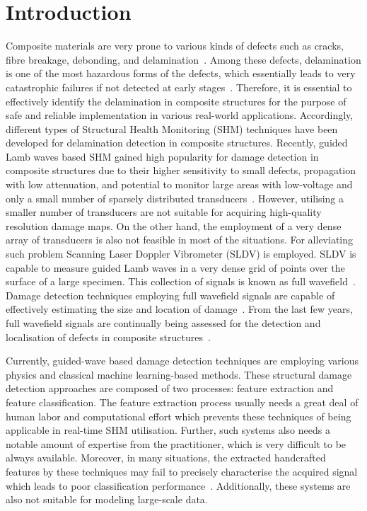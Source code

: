 \section{Introduction}
Composite materials are very prone to various kinds of defects such as cracks, fibre breakage, debonding, and delamination~\cite{ip2004delamination, smith2009composite}. 
Among these defects, delamination is one of the most hazardous forms of the defects, which essentially leads to very catastrophic failures if not detected at early stages~\cite{valdes1999delamination}. 
Therefore, it is essential to effectively identify the delamination in composite structures for the purpose of safe and reliable implementation in various real-world applications. 
Accordingly, different types of Structural Health Monitoring (SHM) techniques have been developed for delamination detection in composite structures. 
Recently, guided Lamb waves based SHM gained high popularity for damage detection in composite structures due to their higher sensitivity to small defects, propagation with low attenuation, and potential to monitor large areas with low-voltage and only a small number of sparsely distributed transducers~\cite{alleyne1992interaction, giurgiutiu2003lamb, ihn2008pitch, mitra2016guided}. 
However, utilising a smaller number of transducers are not suitable for acquiring high-quality resolution damage maps. 
On the other hand, the employment of a very dense array of transducers is also not feasible in most of the situations. For alleviating such problem Scanning Laser Doppler Vibrometer (SLDV) is employed. SLDV is capable to measure guided Lamb waves in a very dense grid of points over the surface of a large specimen. 
This collection of signals is known as full wavefield~\cite{radzienski2019damage}. 
Damage detection techniques employing full wavefield signals are capable of effectively estimating the size and location of damage~\cite{girolamo2018impact, kudela2018impact}. From the last few years, full wavefield signals are continually being assessed for the detection and localisation of defects in composite structures~\cite{sohn2011delamination, sohn2011automated, rogge2013characterization, kudela2018impact, radzienski2019damage}.

Currently, guided-wave based damage detection techniques are employing various physics and classical machine learning-based methods. 
These structural damage detection approaches are composed of two processes: feature extraction and feature classification. 
The feature extraction process usually needs a great deal of human labor and computational effort which prevents these techniques of being applicable in real-time SHM utilisation. 
Further, such systems also needs a notable amount of expertise from the practitioner, which is very difficult to be always available.
Moreover, in many situations, the extracted handcrafted features by these techniques may fail to precisely characterise the acquired signal which leads to poor classification performance~\cite{zhao2019deep, yuan2020machine}. Additionally, these systems are also not suitable for modeling large-scale data.

